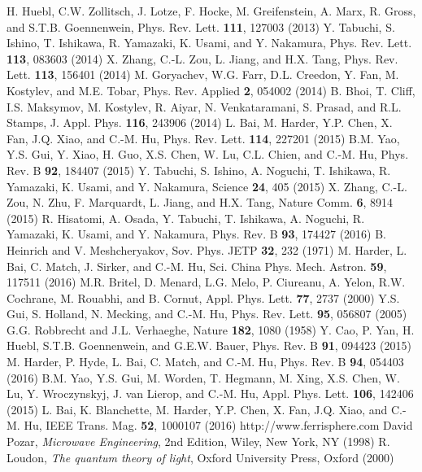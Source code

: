 \documentclass[prb,twocolumn,showpacs,preprintnumbers,amsmath,amssymb]{revtex4-1}
\begin{document}
\begin{thebibliography}{199}

H. Huebl, C.W. Zollitsch, J. Lotze, F. Hocke, M. Greifenstein, A. Marx, R. Gross, and S.T.B. Goennenwein, Phys. Rev. Lett. \textbf{111}, 127003 (2013)
Y. Tabuchi, S. Ishino, T. Ishikawa, R. Yamazaki, K. Usami, and Y. Nakamura, Phys. Rev. Lett. \textbf{113}, 083603 (2014)
X. Zhang, C.-L. Zou, L. Jiang, and H.X. Tang, Phys. Rev. Lett. \textbf{113}, 156401 (2014)
M. Goryachev, W.G. Farr, D.L. Creedon, Y. Fan, M. Kostylev, and M.E. Tobar, Phys. Rev. Applied \textbf{2}, 054002 (2014)
B. Bhoi, T. Cliff, I.S. Maksymov, M. Kostylev, R. Aiyar, N. Venkataramani, S. Prasad, and R.L. Stamps, J. Appl. Phys. \textbf{116}, 243906 (2014)
L. Bai, M. Harder, Y.P. Chen, X. Fan, J.Q. Xiao, and C.-M. Hu, Phys. Rev. Lett. \textbf{114}, 227201 (2015)
B.M. Yao, Y.S. Gui, Y. Xiao, H. Guo, X.S. Chen, W. Lu, C.L. Chien, and C.-M. Hu, Phys. Rev. B \textbf{92}, 184407 (2015)
Y. Tabuchi, S. Ishino, A. Noguchi, T. Ishikawa, R. Yamazaki, K. Usami, and Y. Nakamura, Science \textbf{24}, 405 (2015)
X. Zhang, C.-L. Zou, N. Zhu, F. Marquardt, L. Jiang, and H.X. Tang, Nature Comm. \textbf{6}, 8914 (2015)
R. Hisatomi, A. Osada, Y. Tabuchi, T. Ishikawa, A. Noguchi, R. Yamazaki, K. Usami, and Y. Nakamura, Phys. Rev. B \textbf{93}, 174427 (2016)
B. Heinrich and V. Meshcheryakov, Sov. Phys. JETP \textbf{32}, 232 (1971)
M. Harder, L. Bai, C. Match, J. Sirker, and C.-M. Hu, Sci. China Phys. Mech. Astron. \textbf{59}, 117511 (2016)
M.R. Britel, D. Menard, L.G. Melo, P. Ciureanu, A. Yelon, R.W. Cochrane, M. Rouabhi, and B. Cornut, Appl. Phys. Lett. \textbf{77}, 2737 (2000)
Y.S. Gui, S. Holland, N. Mecking, and C.-M. Hu, Phys. Rev. Lett. \textbf{95}, 056807 (2005)
G.G. Robbrecht and J.L. Verhaeghe, Nature \textbf{182}, 1080 (1958)
Y. Cao, P. Yan, H. Huebl, S.T.B. Goennenwein, and G.E.W. Bauer, Phys. Rev. B \textbf{91}, 094423 (2015)
M. Harder, P. Hyde, L. Bai, C. Match, and C.-M. Hu, Phys. Rev. B \textbf{94}, 054403 (2016)
B.M. Yao, Y.S. Gui, M. Worden, T. Hegmann, M. Xing, X.S. Chen, W. Lu, Y. Wroczynskyj, J. van Lierop, and C.-M. Hu, Appl. Phys. Lett. \textbf{106}, 142406 (2015)
L. Bai, K. Blanchette, M. Harder, Y.P. Chen, X. Fan, J.Q. Xiao, and C.-M. Hu, IEEE Trans. Mag. \textbf{52}, 1000107 (2016)
http://www.ferrisphere.com
David Pozar, \textit{Microwave Engineering}, 2nd Edition, Wiley, New York, NY (1998)
R. Loudon, \textit{The quantum theory of light}, Oxford University Press, Oxford (2000)


\end{thebibliography}
\end{document}
